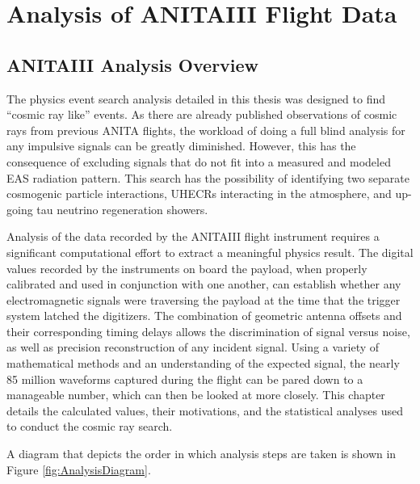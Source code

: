 \chapter{Analysis of ANITAIII Flight Data}
\section{ANITAIII Analysis Overview}%
	The physics event search analysis detailed in this thesis was designed to find ``cosmic ray like'' events.  As there are already published observations of cosmic rays from previous ANITA flights, the workload of doing a full blind analysis for any impulsive signals can be greatly diminished.  However, this has the consequence of excluding signals that do not fit into a measured and modeled EAS radiation pattern.  This search has the possibility of identifying two separate cosmogenic particle interactions, UHECRs interacting in the atmosphere, and up-going tau neutrino regeneration showers.
	
	Analysis of the data recorded by the ANITAIII flight instrument requires a significant computational effort to extract a meaningful physics result.  The digital values recorded by the instruments on board the payload, when properly calibrated and used in conjunction with one another, can establish whether any electromagnetic signals were traversing the payload at the time that the trigger system latched the digitizers.  The combination of geometric antenna offsets and their corresponding timing delays allows the discrimination of signal versus noise, as well as precision reconstruction of any incident signal.  Using a variety of mathematical methods and an understanding of the expected signal, the nearly 85 million waveforms captured during the flight can be pared down to a manageable number, which can then be looked at more closely.  This chapter details the calculated values, their motivations, and the statistical analyses used to conduct the cosmic ray search.
	
	A diagram that depicts the order in which analysis steps are taken is shown in Figure \ref{fig:AnalysisDiagram}. 
	
